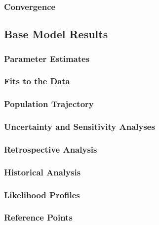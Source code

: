 \documentclass[12pt,]{article}
\begin{document}
\subsubsection{Convergence}\label{convergence}

\subsection{Base Model Results}\label{base-model-results}

\subsubsection{Parameter Estimates}\label{parameter-estimates}

\subsubsection{Fits to the Data}\label{fits-to-the-data}

\subsubsection{Population Trajectory}\label{population-trajectory}

\subsubsection{Uncertainty and Sensitivity
Analyses}\label{uncertainty-and-sensitivity-analyses}

\subsubsection{Retrospective Analysis}\label{retrospective-analysis}

\subsubsection{Historical Analysis}\label{historical-analysis}

\subsubsection{Likelihood Profiles}\label{likelihood-profiles}

\subsubsection{Reference Points}\label{reference-points-1}
\end{document}
